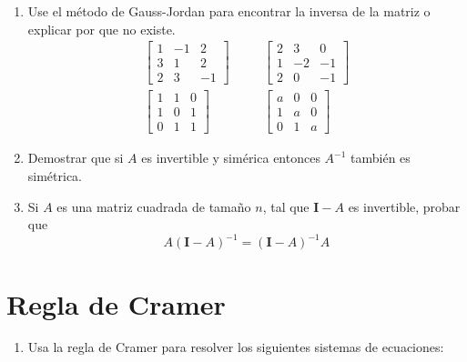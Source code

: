 \documentclass[
]{article}
\providecommand{\tightlist}{%
  \setlength{\itemsep}{0pt}\setlength{\parskip}{0pt}}
\begin{document}
\begin{enumerate}
\def\labelenumi{\arabic{enumi}.}
\setcounter{enumi}{12}
\item
  Use el método de Gauss-Jordan para encontrar la inversa de la matriz o
  explicar por que no existe. \begin{equation*}
  \begin{array}{ccc}
    \begin{bmatrix} 
  1  & -1 & 2 \\ 
  3  & 1 & 2 \\
  2  & 3 & -1
    \end{bmatrix} & \,\,\,\,\,\, &
    \begin{bmatrix} 
  2  & 3 & 0 \\ 
  1  &-2 &-1 \\
  2  & 0 &-1
    \end{bmatrix} \\
  \begin{bmatrix} 
  1  & 1 & 0 \\ 
  1  & 0 & 1 \\
  0  & 1 & 1
    \end{bmatrix} & \,\,\,\,\,\, &
    \begin{bmatrix} 
  a  & 0 & 0 \\ 
  1  & a & 0 \\
  0  & 1 & a
    \end{bmatrix}
  \end{array}
  \end{equation*}
\item
  Demostrar que si \(A\) es invertible y simérica entonces \(A^{-1}\)
  también es simétrica.
\item
  Si \(A\) es una matriz cuadrada de tamaño \(n\), tal que
  \(\mathbf{I}-A\) es invertible, probar que \[
  A(\mathbf{I}-A)^{-1} = (\mathbf{I}-A)^{-1}A
  \] \newpage
\end{enumerate}

\hypertarget{regla-de-cramer}{%
\section{Regla de Cramer}\label{regla-de-cramer}}

\begin{enumerate}
\def\labelenumi{\arabic{enumi}.}
\tightlist
\item
  Usa la regla de Cramer para resolver los siguientes sistemas de
  ecuaciones:
\end{enumerate}
\end{document}
